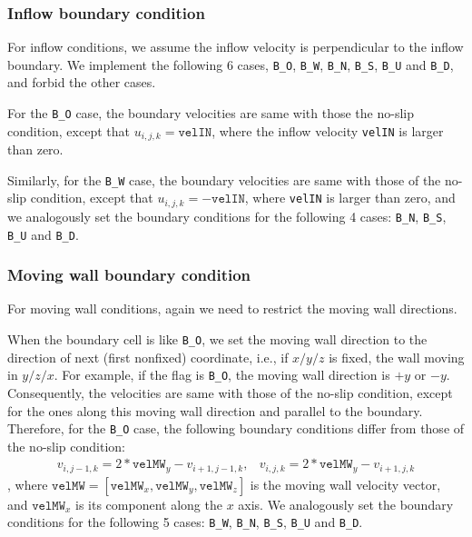 \documentclass[a4paper, 12pt]{article}
\begin{document}
\subsubsection{Inflow boundary condition}
For inflow conditions, we assume the inflow velocity is perpendicular to the inflow boundary. We implement the following 6 cases, \texttt{B\_O}, \texttt{B\_W}, \texttt{B\_N}, \texttt{B\_S}, \texttt{B\_U} and \texttt{B\_D}, and forbid the other cases.

For the \texttt{B\_O} case, the boundary velocities are same with those the no-slip condition, except that $u_{i,j,k} = \texttt{velIN}$, where the inflow velocity \texttt{velIN} is larger than zero.

Similarly, for the \texttt{B\_W} case, the boundary velocities are same with those of the no-slip condition, except that $u_{i,j,k} = -\texttt{velIN}$, where \texttt{velIN} is larger than zero, and we analogously set the boundary conditions for the following 4 cases: \texttt{B\_N}, \texttt{B\_S}, \texttt{B\_U} and \texttt{B\_D}.

\subsubsection{Moving wall boundary condition}
For moving wall conditions, again we need to restrict the moving wall directions.

When the boundary cell is like \texttt{B\_O}, we set the moving wall direction to the direction of next (first nonfixed) coordinate, i.e., if $x/y/z$ is fixed, the wall moving in $y/z/x$. For example, if the flag is \texttt{B\_O}, the moving wall direction is $+y$ or $-y$. Consequently, the velocities are same with those of the no-slip condition, except for the ones along this moving wall direction and parallel to the boundary. Therefore, for the \texttt{B\_O} case, the following boundary conditions differ from those of the no-slip condition:
\begin{equation}
\begin{array}{ll}
v_{i,j-1,k} = 2*\texttt{velMW}_y-v_{i+1,j-1,k}, & v_{i,j,k} = 2*\texttt{velMW}_y-v_{i+1,j,k}
\end{array}
\end{equation}
, where $\texttt{velMW} = [\texttt{velMW}_x, \texttt{velMW}_y, \texttt{velMW}_z]$ is the moving wall velocity vector, and $\texttt{velMW}_x$ is its component along the $x$ axis. We analogously set the boundary conditions for the following 5 cases: \texttt{B\_W}, \texttt{B\_N}, \texttt{B\_S}, \texttt{B\_U} and \texttt{B\_D}.
\end{document}
